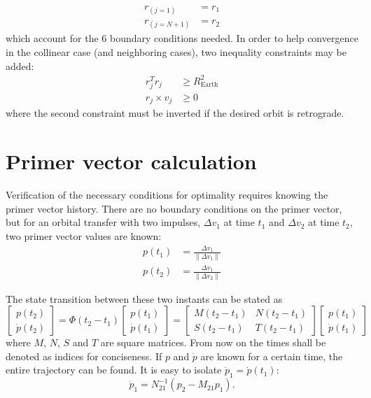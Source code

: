\begin{align}
    r_{(j=1)} &= r_1 \\
    r_{(j=N+1)} &= r_2
\end{align}
which account for the 6 boundary conditions needed. In order to help convergence in the collinear case (and neighboring cases), two inequality constraints may be added:
\begin{align}
    r_j^T r_j &\geq R_{\text{Earth}}^2 \\
    r_j \times v_j &\geq 0
\end{align}
where the second constraint must be inverted if the desired orbit is retrograde. 

\section{Primer vector calculation}

Verification of the necessary conditions for optimality requires knowing the primer vector history. There are no boundary conditions on the primer vector, but for an orbital transfer with two impulses, \(\Delta v_1\) at time \(t_1\) and \(\Delta v_2\) at time \(t_2\), two primer vector values are known:
\begin{align}
    p(t_1) &= \frac{\Delta v_1}{\lVert \Delta v_1 \rVert} \\
    p(t_2) &= \frac{\Delta v_1}{\lVert \Delta v_2 \rVert}
\end{align}

The state transition between these two instants can be stated as
\begin{equation}
    \begin{bmatrix}
        p(t_2) \\ \dot p(t_2)
    \end{bmatrix} = \Phi(t_2 - t_1) \begin{bmatrix}
        p(t_1) \\ \dot p(t_1)
    \end{bmatrix} = \begin{bmatrix}
        M(t_2-t_1) & N(t_2-t_1) \\ S(t_2-t_1) & T(t_2-t_1)
    \end{bmatrix} \begin{bmatrix}
        p(t_1) \\ \dot p(t_1)
    \end{bmatrix}
\end{equation}
where \(M\), \(N\), \(S\) and \(T\) are square matrices. From now on the times shall be denoted as indices for conciseness. If \(p\) and \(\dot p\) are known for a certain time, the entire trajectory can be found. It is easy to isolate \(\dot p_1 = \dot p(t_1)\):
\begin{equation}
    \dot p_1 = N^{-1}_{21} \left(p_2 - M_{21}p_1\right).
\end{equation}


